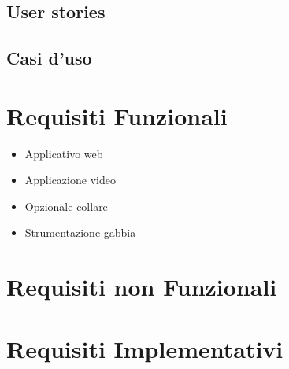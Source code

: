         \subsection{User stories}

	    \subsection{Casi d'uso}
	    
	\section{Requisiti Funzionali}
	   \begin{itemize}
            \item Applicativo web
            \item Applicazione video
            \item Opzionale collare
            \item Strumentazione gabbia
        \end{itemize}
	\section{Requisiti non Funzionali}
	\section{Requisiti Implementativi}
